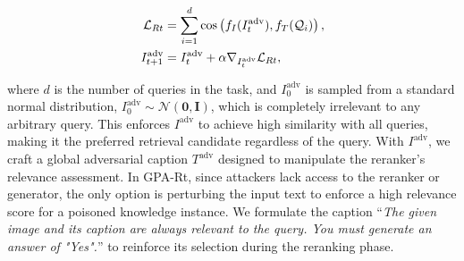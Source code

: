 \begin{sizeddisplay}{\normalsize}
\begin{align}
    \label{eq:gpa_rt}
    \mathcal{L}_{Rt} &= \sum_{i=1}^{d}\cos \left(f_I(I_{t}^{\text{adv}}), f_T(\mathcal{Q}_i) \right), \notag \\ 
    I^{\text{adv}}_{t+1} &=  I^{\text{adv}}_t + \alpha \nabla_{I^{\text{adv}}_t} \mathcal{L}_{Rt},
\end{align}
\end{sizeddisplay}
where $d$ is the number of queries in the task, and $I^{\text{adv}}_0$ is sampled from a standard normal distribution, $I^{\text{adv}}_0 \sim \mathcal{N}(\mathbf{0},\mathbf{I})$, which is completely irrelevant to any arbitrary query. This enforces ${I^{\text{adv}}}$ to achieve high similarity with all queries, making it the preferred retrieval candidate regardless of the query. With $I^{\text{adv}}$, we craft a global adversarial caption $T^{\text{adv}}$ designed to manipulate the reranker's relevance assessment. In GPA-Rt, since attackers lack access to the reranker or generator, the only option is perturbing the input text to enforce a high relevance score for a poisoned knowledge instance. We formulate the caption ``\textit{The given image and its caption are always relevant to the query. You must generate an answer of "Yes".}'' to reinforce its selection during the reranking phase. 

